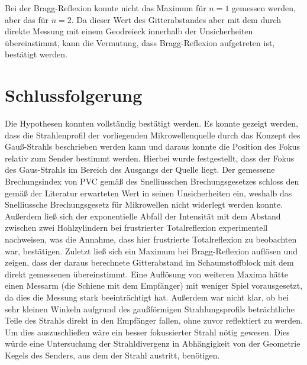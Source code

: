 \documentclass[
	a4paper,
	12pt,
	pagesize,
	ngerman
]{scrartcl}
\begin{document}
	Bei der Bragg-Reflexion konnte nicht das Maximum für $n=1$ gemessen werden, aber das für $n=2$.
	Da dieser Wert des Gitterabstandes aber mit dem durch direkte Messung mit einem Geodreieck innerhalb der Unsicherheiten übereinstimmt, kann die Vermutung, dass Bragg-Reflexion aufgetreten ist, bestätigt werden. 
	 
	
	
	\section{Schlussfolgerung}
	Die Hypothesen konnten vollständig bestätigt werden.
	Es konnte gezeigt werden, dass die Strahlenprofil der vorliegenden Mikrowellenquelle durch das Konzept des Gauß-Strahls beschrieben werden kann und daraus konnte die Position des Fokus relativ zum Sender bestimmt werden.
	Hierbei wurde festgestellt, dass der Fokus des Gaus-Strahls im Bereich des Ausgangs der Quelle liegt.
	Der gemessene Brechungsindex von PVC gemäß des Snelliusschen Brechungsgesetzes schloss den gemäß der Literatur erwarteten Wert in seinen Unsicherheiten ein, weshalb das Snelliussche Brechungsgesetz für Mikrowellen nicht widerlegt werden konnte.
	Außerdem ließ sich der exponentielle Abfall der Intensität mit dem Abstand zwischen zwei Hohlzylindern bei frustrierter Totalreflexion experimentell nachweisen, was die Annahme, dass hier frustrierte Totalreflexion zu beobachten war, bestätigen.
	Zuletzt ließ sich ein Maximum bei Bragg-Reflexion auflösen und zeigen, dass der daraus berechnete Gitterabstand im Schaumstoffblock mit dem direkt gemessenen übereinstimmt.
	Eine Auflösung von weiteren Maxima hätte einen Messarm (die Schiene mit dem Empfänger) mit weniger Spiel vorausgesetzt, da dies die Messung stark beeinträchtigt hat.
	Außerdem war nicht klar, ob bei sehr kleinen Winkeln aufgrund des gaußförmigen Strahlungsprofils beträchtliche Teile des Strahls direkt in den Empfänger fallen, ohne zuvor reflektiert zu werden.
	Um dies auszuschließen wäre ein besser fokussierter Strahl nötig gewesen.
	Dies würde eine Untersuchung der Strahldivergenz in Abhängigkeit von der Geometrie Kegels des Senders, aus dem der Strahl austritt, benötigen.
	
	\printbibliography
\end{document}
